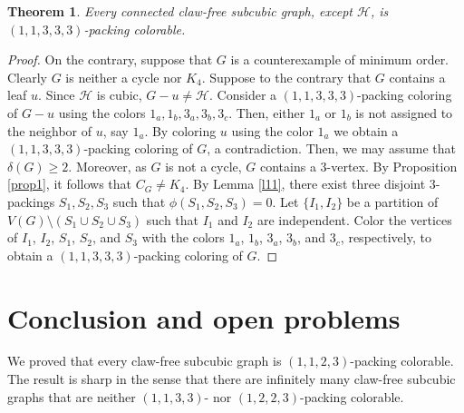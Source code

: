\documentclass[12pt, oneside]{scrartcl}
\newtheorem{theorem}{Theorem}%
\begin{document}
\begin{theorem}\label{t4}
    Every connected claw-free subcubic graph, except $\mathcal{H}$, is $(1,1,3,3,3)$-packing colorable.
\end{theorem}
\begin{proof}
    On the contrary, suppose that $G$ is a counterexample of minimum order. Clearly $G$ is neither a cycle nor $K_4$. Suppose to the contrary that $G$ contains a leaf $u$. Since $\mathcal{H}$ is cubic, $G-u\neq \mathcal{H}$. Consider a $(1,1,3,3,3)$-packing coloring of $G-u$ using the colors $1_a,1_b,3_a,3_b,3_c$. Then, either $1_a$ or $1_b$ is not assigned to the neighbor of $u$, say $1_a$. By coloring $u$ using the color $1_a$ we obtain a $(1,1,3,3,3)$-packing coloring of $G$, a contradiction. Then, we may assume that $\delta(G)\geq 2$. Moreover, as $G$ is not a cycle, $G$ contains a $3$-vertex. By Proposition \ref{prop1}, it follows that $C_G\neq K_4$. By Lemma \ref{l11}, there exist three disjoint $3$-packings $S_1,S_2,S_3$ such that $\phi(S_1,S_2,S_3)=0$. Let $\{I_1,I_2\}$ be a partition of $V(G)\setminus (S_1\cup S_2\cup S_3)$ such that $I_1$ and $I_2$ are independent. Color the vertices of $I_1$, $I_2$, $S_1$, $S_2$, and $S_3$ with the colors $1_a$, $1_b$, $3_a$, $3_b$, and $3_c$, respectively, to obtain a $(1,1,3,3,3)$-packing coloring of $G$.
\end{proof}


\section{Conclusion and open problems}
We proved that every claw-free subcubic graph is $(1,1,2,3)$-packing colorable. The result is sharp in the sense that there are infinitely many claw-free subcubic graphs that are neither $(1,1,3,3)$- nor $(1,2,2,3)$-packing colorable.
\end{document}
